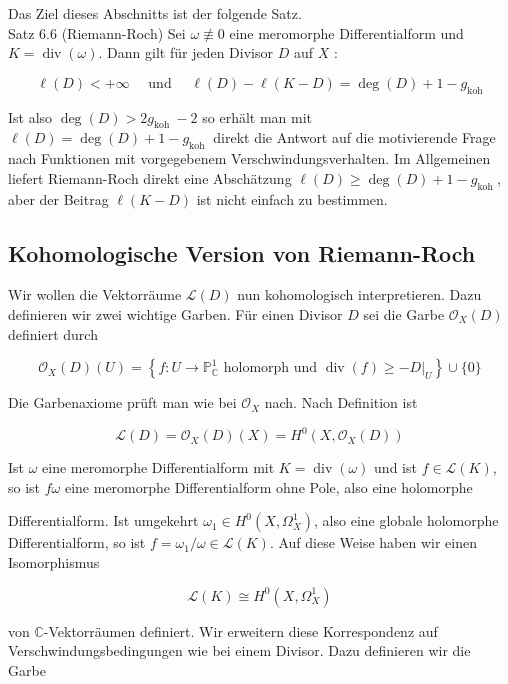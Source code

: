 \documentclass[10pt, letterpaper]{article}
\begin{document}
Das Ziel dieses Abschnitts ist der folgende Satz.\\
Satz 6.6 (Riemann-Roch) Sei $\omega \not \equiv 0$ eine meromorphe Differentialform und $K= \operatorname{div}(\omega)$. Dann gilt für jeden Divisor $D$ auf $X$ :

$$
\ell(D)<+\infty \quad \text { und } \quad \ell(D)-\ell(K-D)=\operatorname{deg}(D)+1-g_{\mathrm{koh}}
$$

Ist also $\operatorname{deg}(D)>2 g_{\text {koh }}-2$ so erhält man mit $\ell(D)=\operatorname{deg}(D)+1-g_{\text {koh }}$ direkt die Antwort auf die motivierende Frage nach Funktionen mit vorgegebenem Verschwindungsverhalten. Im Allgemeinen liefert Riemann-Roch direkt eine Abschätzung $\ell(D) \geq \operatorname{deg}(D)+1-g_{\text {koh }}$, aber der Beitrag $\ell(K-D)$ ist nicht einfach zu bestimmen.

\subsection {Kohomologische Version von Riemann-Roch}
Wir wollen die Vektorräume $\mathcal{L}(D)$ nun kohomologisch interpretieren. Dazu definieren wir zwei wichtige Garben. Für einen Divisor $D$ sei die Garbe $\mathcal{O}_{X}(D)$ definiert durch

$$
\mathcal{O}_{X}(D)(U)=\left\{f: U \rightarrow \mathbb{P}_{\mathbb{C}}^{1} \text { holomorph und } \operatorname{div}(f) \geq-\left.D\right|_{U}\right\} \cup\{0\}
$$

Die Garbenaxiome prüft man wie bei $\mathcal{O}_{X}$ nach. Nach Definition ist

$$
\mathcal{L}(D)=\mathcal{O}_{X}(D)(X)=H^{0}\left(X, \mathcal{O}_{X}(D)\right)
$$

Ist $\omega$ eine meromorphe Differentialform mit $K=\operatorname{div}(\omega)$ und ist $f \in \mathcal{L}(K)$, so ist $f \omega$ eine meromorphe Differentialform ohne Pole, also eine holomorphe

Differentialform. Ist umgekehrt $\omega_{1} \in H^{0}\left(X, \Omega_{X}^{1}\right)$, also eine globale holomorphe Differentialform, so ist $f=\omega_{1} / \omega \in \mathcal{L}(K)$. Auf diese Weise haben wir einen Isomorphismus

$$
\mathcal{L}(K) \cong H^{0}\left(X, \Omega_{X}^{1}\right)
$$

von $\mathbb{C}$-Vektorräumen definiert. Wir erweitern diese Korrespondenz auf Verschwindungsbedingungen wie bei einem Divisor. Dazu definieren wir die Garbe
\end{document}
